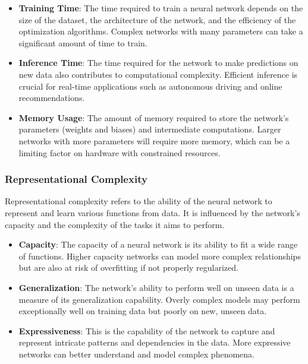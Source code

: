 \documentclass[11pt,a4paper]{article}
\begin{document}
\begin{itemize}
    \item \textbf{Training Time}: The time required to train a neural network depends on the size of the dataset, the architecture of the network, and the efficiency of the optimization algorithms. Complex networks with many parameters can take a significant amount of time to train.
    
    \item \textbf{Inference Time}: The time required for the network to make predictions on new data also contributes to computational complexity. Efficient inference is crucial for real-time applications such as autonomous driving and online recommendations.
    
    \item \textbf{Memory Usage}: The amount of memory required to store the network's parameters (weights and biases) and intermediate computations. Larger networks with more parameters will require more memory, which can be a limiting factor on hardware with constrained resources.
\end{itemize}

\subsubsection{Representational Complexity}

Representational complexity refers to the ability of the neural network to represent and learn various functions from data. It is influenced by the network's capacity and the complexity of the tasks it aims to perform.

\begin{itemize}
    \item \textbf{Capacity}: The capacity of a neural network is its ability to fit a wide range of functions. Higher capacity networks can model more complex relationships but are also at risk of overfitting if not properly regularized.
    
    \item \textbf{Generalization}: The network's ability to perform well on unseen data is a measure of its generalization capability. Overly complex models may perform exceptionally well on training data but poorly on new, unseen data.
    
    \item \textbf{Expressiveness}: This is the capability of the network to capture and represent intricate patterns and dependencies in the data. More expressive networks can better understand and model complex phenomena.
\end{itemize}
\end{document}

